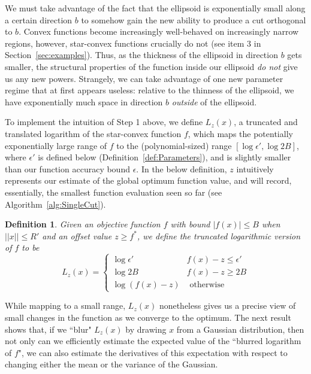 \documentclass[11pt,letter]{article}
\newcommand{\ferr}{\epsilon}
\newcounter{nTheorems}
\numberwithin{nTheorems}{section}
\newtheorem{definition}[nTheorems]{Definition}
\begin{document}
\begin{enumerate}
We must take advantage of the fact that the ellipsoid is exponentially small along a certain direction $b$ to somehow gain the new ability to produce a cut orthogonal to $b$.
Convex functions become increasingly well-behaved on increasingly narrow regions, however, star-convex functions crucially do not (see item 3 in Section~\ref{sec:examples}).
Thus, as the thickness of the ellipsoid in direction $b$ gets smaller, the structural properties of the function inside our ellipsoid \emph{do not} give us any new powers.
Strangely, we can take advantage of one new parameter regime that at first appears useless: relative to the thinness of the ellipsoid, we have exponentially much space in direction $b$ \emph{outside} of the ellipsoid.
\end{enumerate}

To implement the intuition of Step 1 above, we define $L_z(x)$, a truncated and translated logarithm of the star-convex function $f$, which maps the potentially exponentially large range of $f$ to the (polynomial-sized) range $[\log \epsilon',\log 2B]$, where $\epsilon'$ is defined below (Definition~\ref{def:Parameters}), and is slightly smaller than our function accuracy bound $\ferr$. In the below definition, $z$ intuitively represents our estimate of the global optimum function value, and will record, essentially, the smallest function evaluation seen so far (see Algorithm~\ref{alg:SingleCut}).

\begin{definition}
\label{def:BlurredLog}
Given an objective function $f$ with bound $|f(x)| \le B$ when $||x||\leq R'$ and an offset value $z\ge f^\ast$, we define the \emph{truncated logarithmic version of $f$} to be
$$ L_z(x) = \begin{cases} \log \epsilon' & f(x) - z \le \epsilon'\\ \log 2B & f(x) - z \ge 2B\\ \log (f(x)-z) & \text{ otherwise}\end{cases} $$
\end{definition}

While mapping to a small range, $L_z(x)$ nonetheless gives us a precise view of small changes in the function as we converge to the optimum. The next result shows that, if we ``blur" $L_z(x)$ by drawing $x$ from a Gaussian distribution, then not only can we efficiently estimate the expected value of the ``blurred logarithm of $f$", we can also estimate the derivatives of this expectation with respect to changing either the mean or the variance of the Gaussian.
\end{document}
